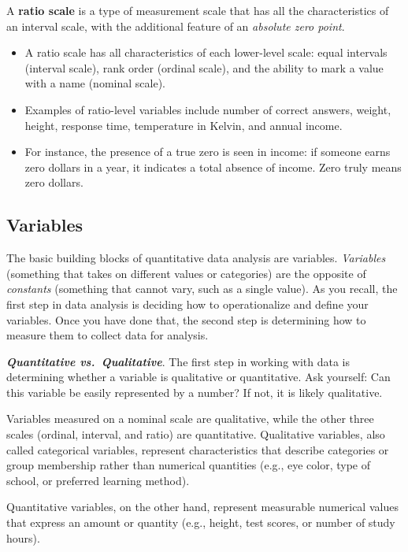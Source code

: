 \documentclass[
  letterpaper,
  DIV=11,
  numbers=noendperiod]{scrreprt}
\begin{document}
A \textbf{ratio scale} is a type of measurement scale that has all the
characteristics of an interval scale, with the additional feature of an
\emph{absolute zero point}.

\begin{itemize}
\item
  A ratio scale has all characteristics of each lower-level scale: equal
  intervals (interval scale), rank order (ordinal scale), and the
  ability to mark a value with a name (nominal scale).
\item
  Examples of ratio-level variables include number of correct answers,
  weight, height, response time, temperature in Kelvin, and annual
  income.
\item
  For instance, the presence of a true zero is seen in income: if
  someone earns zero dollars in a year, it indicates a total absence of
  income. Zero truly means zero dollars.
\end{itemize}

\subsection{Variables}\label{variables}

The basic building blocks of quantitative data analysis are variables.
\emph{Variables} (something that takes on different values or
categories) are the opposite of \emph{constants} (something that cannot
vary, such as a single value). As you recall, the first step in data
analysis is deciding how to operationalize and define your variables.
Once you have done that, the second step is determining how to measure
them to collect data for analysis.

\textbf{\emph{Quantitative vs.~Qualitative}}. The first step in working
with data is determining whether a variable is qualitative or
quantitative. Ask yourself: Can this variable be easily represented by a
number? If not, it is likely qualitative.

Variables measured on a nominal scale are qualitative, while the other
three scales (ordinal, interval, and ratio) are quantitative.
Qualitative variables, also called categorical variables, represent
characteristics that describe categories or group membership rather than
numerical quantities (e.g., eye color, type of school, or preferred
learning method).

Quantitative variables, on the other hand, represent measurable
numerical values that express an amount or quantity (e.g., height, test
scores, or number of study hours).
\end{document}
